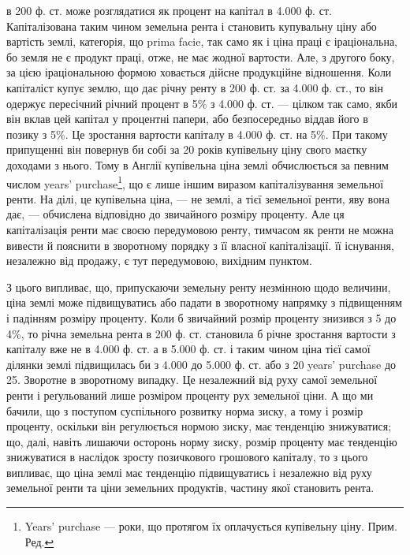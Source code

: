 \parcont{}  %
в 200 ф. ст. може розглядатися як процент на капітал в \num{4.000} ф. ст. Капіталізована
таким чином земельна рента і становить купувальну ціну або вартість землі,
категорія, що prima facie, так само як і ціна праці є іраціональна, бо земля не є продукт
праці, отже, не має жодної вартости. Але, з другого боку, за цією іраціональною
формою ховається дійсне продукційне відношення. Коли капіталіст купує
землю, що дає річну ренту в 200 ф. ст. за \num{4.000} ф. ст., то він одержує пересічний річний
процент в 5\% з \num{4.000} ф. ст. — цілком так само, якби він вклав цей капітал у
процентні папери, або безпосередньо віддав його в позику з 5\%. Це зростання вартости
капіталу в \num{4.000} ф. ст. на 5\%. При такому припущенні він повернув би собі
за 20 років купівельну ціну свого маєтку доходами з нього. Тому в Англії купівельна
ціна землі обчислюється за певним числом years’ purchase\footnote*{
Years’ purchase — роки, що протягом їх оплачується купівельну ціну. Прим. Ред.
}, що є лише іншим
виразом капіталізування земельної ренти. На ділі, це купівельна ціна, — не
землі, а тієї земельної ренти, яву вона дає, — обчислена відповідно до звичайного
розміру проценту. Але ця капіталізація ренти має своєю передумовою
ренту, тимчасом як ренти не можна вивести й пояснити в зворотному порядку
з її власної капіталізації. її існування, незалежно від продажу, є тут
передумовою, вихідним пунктом.

З цього випливає, що, припускаючи земельну ренту незмінною щодо величини,
ціна землі може підвищуватись або падати в зворотному напрямку з
підвищенням і падінням розміру проценту. Коли б звичайний розмір проценту
знизився з 5 до 4\%, то річна земельна рента в 200 ф. ст. становила б річне
зростання вартости з капіталу вже не в \num{4.000} ф. ст. а в \num{5.000} ф. ст. і таким чином
ціна тієї самої ділянки землі підвищилась би з \num{4.000} до \num{5.000} ф. ст. або з 20 years’
purchase до 25. Зворотне в зворотному випадку. Це незалежний від руху самої
земельної ренти і реґульований лише розміром проценту рух земельної ціни.
А що ми бачили, що з поступом суспільного розвитку норма зиску, а тому і
розмір проценту, оскільки він регулюється нормою зиску, має тенденцію
знижуватися; що, далі, навіть лишаючи осторонь норму зиску, розмір проценту
має тенденцію знижуватися в наслідок зросту позичкового грошового капіталу,
то з цього випливає, що ціна землі має тенденцію підвищуватись і незалежно
від руху земельної ренти та ціни земельних продуктів, частину якої становить
рента.

